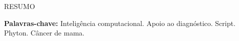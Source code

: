 RESUMO
\vspace{\onelineskip}

\noindent

\textbf{Palavras-chave:} Inteligência computacional. Apoio ao diagnóstico. Script. Phyton. Câncer de mama.
